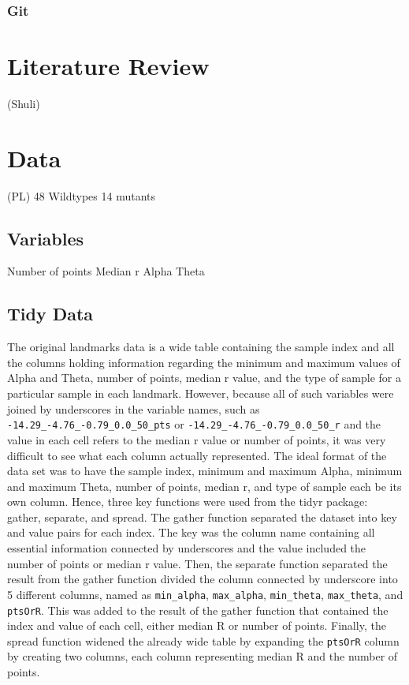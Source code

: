 \documentclass[10pt,letterpaper]{article}
\begin{document}
\subsubsection{Git}\label{git}

\section{Literature Review}\label{literature-review}

(Shuli)

\section{Data}\label{data}

(PL) 48 Wildtypes 14 mutants

\subsection{Variables}\label{variables}

Number of points Median r Alpha Theta

\subsection{Tidy Data}\label{tidy-data}

The original landmarks data is a wide table containing the sample index
and all the columns holding information regarding the minimum and
maximum values of Alpha and Theta, number of points, median r value, and
the type of sample for a particular sample in each landmark. However,
because all of such variables were joined by underscores in the variable
names, such as \texttt{-14.29\_-4.76\_-0.79\_0.0\_50\_pts} or
\texttt{-14.29\_-4.76\_-0.79\_0.0\_50\_r} and the value in each cell
refers to the median r value or number of points, it was very difficult
to see what each column actually represented. The ideal format of the
data set was to have the sample index, minimum and maximum Alpha,
minimum and maximum Theta, number of points, median r, and type of
sample each be its own column. Hence, three key functions were used from
the tidyr package: gather, separate, and spread. The gather function
separated the dataset into key and value pairs for each index. The key
was the column name containing all essential information connected by
underscores and the value included the number of points or median r
value. Then, the separate function separated the result from the gather
function divided the column connected by underscore into 5 different
columns, named as \texttt{min\_alpha}, \texttt{max\_alpha},
\texttt{min\_theta}, \texttt{max\_theta}, and \texttt{ptsOrR}. This was
added to the result of the gather function that contained the index and
value of each cell, either median R or number of points. Finally, the
spread function widened the already wide table by expanding the
\texttt{ptsOrR} column by creating two columns, each column representing
median R and the number of points.
\end{document}
